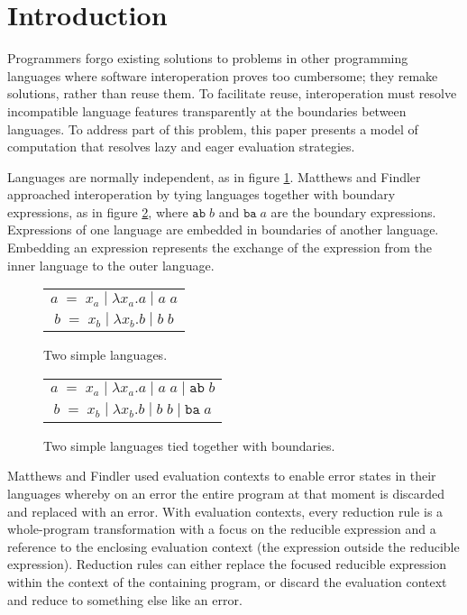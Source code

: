 \section{Introduction}

Programmers forgo existing solutions to problems in other programming languages where software interoperation proves too cumbersome; they remake solutions, rather than reuse them. To facilitate reuse, interoperation must resolve incompatible language features transparently at the boundaries between languages. To address part of this problem, this paper presents a model of computation that resolves lazy and eager evaluation strategies.

Languages are normally independent, as in figure \ref{figsim}. Matthews and Findler \cite{matthews07} approached interoperation by tying languages together with boundary expressions, as in figure \ref{figtie}, where $\mathtt{ab} \; b$ and $\mathtt{ba} \; a$ are the boundary expressions. Expressions of one language are embedded in boundaries of another language. Embedding an expression represents the exchange of the expression from the inner language to the outer language.

\begin{figure}[htb]
\onehalfspacing
\centering
\begin{tabular}{c}
$a \; = \; x_a \; | \; \lambda x_a.a \; | \; a \; a$ \\
$b \; = \; x_b \; | \; \lambda x_b.b \; | \; b \; b$ \\
\end{tabular}
\caption{Two simple languages.}
\label{figsim}
\end{figure}

\begin{figure}[htb]
\onehalfspacing
\centering
\begin{tabular}{c}
$a \; = \; x_a \; | \; \lambda x_a.a \; | \; a \; a \; | \; \mathtt{ab} \; b$ \\
$b \; = \; x_b \; | \; \lambda x_b.b \; | \; b \; b \; | \; \mathtt{ba} \; a$ \\
\end{tabular}
\caption{Two simple languages tied together with boundaries.}
\label{figtie}
\end{figure}

Matthews and Findler used evaluation contexts to enable error states in their languages whereby on an error the entire program at that moment is discarded and replaced with an error. With evaluation contexts, every reduction rule is a whole-program transformation with a focus on the reducible expression and a reference to the enclosing evaluation context (the expression outside the reducible expression). Reduction rules can either replace the focused reducible expression within the context of the containing program, or discard the evaluation context and reduce to something else like an error.

